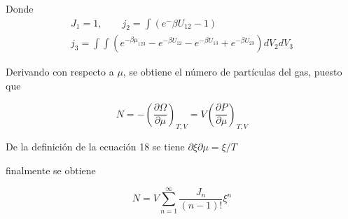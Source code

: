 Donde
\begin{gather}
    J_1 = 1,\qquad
    j_2 = \int \left(e^-{\beta U_{12} - 1}\right)\\
    j_3 = \int\int(e^{-\beta\mu_{123}} - e^{-\beta U_{12}} - 
        e^{-\beta U_{13}} + e^{-\beta U_{23}}) dV_2 dV_3
\end{gather}

Derivando con respecto a $\mu$, se obtiene el número de partículas del gas,
puesto que

\begin{equation}
    N = - {\left(
        \frac{\partial \Omega}{\partial \mu}
    \right)}_{T, V}
    = V {\left(
        \frac{\partial P}{\partial \mu}
    \right)}_{T, V}
\end{equation}

De la definición de la ecuación 18 se tiene $\partial \xi \partial \mu = \xi/T$

finalmente se obtiene

\begin{equation}
    N = V \sum_{n = 1}^{\infty}\frac{J_n}{(n - 1)!}\xi^n
\end{equation}

